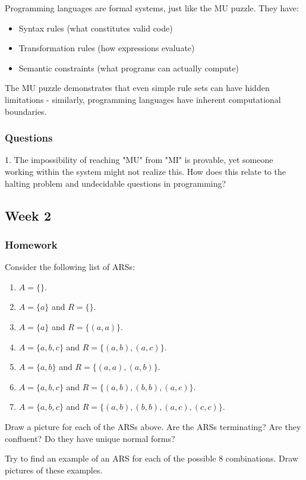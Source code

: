 \documentclass{article}
\theoremstyle{theorem}
\theoremstyle{definition}
\theoremstyle{remark}
\begin{document}
Programming languages are formal systems, just like the MU puzzle. They have:

\begin{itemize}
\item Syntax rules (what constitutes valid code)
\item Transformation rules (how expressions evaluate)  
\item Semantic constraints (what programs can actually compute)
\end{itemize}

The MU puzzle demonstrates that even simple rule sets can have hidden limitations - similarly, programming languages have inherent computational boundaries.

\subsubsection{Questions}
1. The impossibility of reaching "MU" from "MI" is provable, yet someone working within the system might not realize this. How does this relate to the halting problem and undecidable questions in programming?

\subsection{Week 2}
\subsubsection{Homework}
    Consider the following list of ARSs:\newline
    \begin{enumerate}
    \item $A = \{\}$.
    \item $A = \{a\}$ and $R = \{\}$.
    \item $A = \{a\}$ and $R = \{(a,a)\}$.
    \item $A = \{a,b,c\}$ and $R = \{(a,b),(a,c)\}$.
    \item $A = \{a,b\}$ and $R = \{(a,a),(a,b)\}$.
    \item $A = \{a,b,c\}$ and $R = \{(a,b),(b,b),(a,c)\}$.
    \item $A = \{a,b,c\}$ and $R = \{(a,b),(b,b),(a,c),(c,c)\}$.
    \end{enumerate}
    
    Draw a picture for each of the ARSs above. Are the ARSs terminating? Are they confluent? Do they have unique normal forms?

    Try to find an example of an ARS for each of the possible 8 combinations. Draw pictures of these examples.
\end{document}
